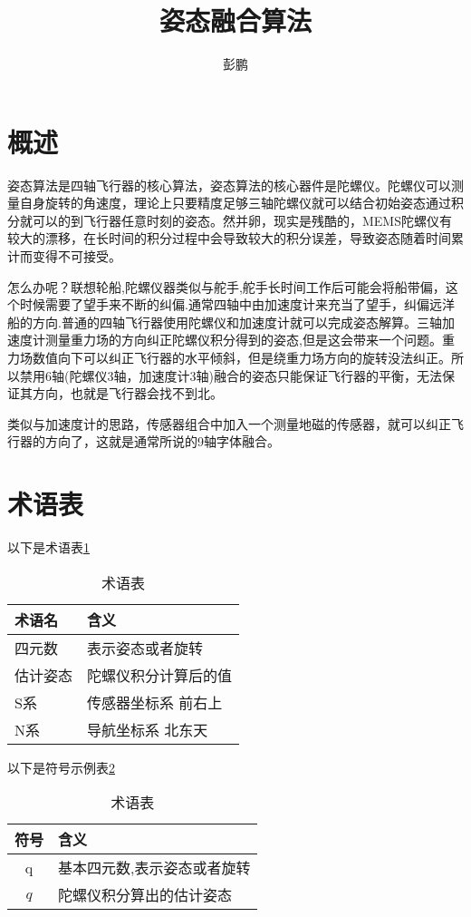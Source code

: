 \documentclass[12pt,a4paper]{article}
\title{姿态融合算法}
\author{彭鹏}
\begin{document}
\maketitle
\tableofcontents
\newpage

\section{概述}
姿态算法是四轴飞行器的核心算法，姿态算法的核心器件是陀螺仪。陀螺仪可以测量自身旋转的角速度，理论上只要精度足够三轴陀螺仪就可以结合初始姿态通过积分就可以的到飞行器任意时刻的姿态。然并卵，现实是残酷的，MEMS陀螺仪有较大的漂移，在长时间的积分过程中会导致较大的积分误差，导致姿态随着时间累计而变得不可接受。

怎么办呢？联想轮船,陀螺仪器类似与舵手,舵手长时间工作后可能会将船带偏，这个时候需要了望手来不断的纠偏.通常四轴中由加速度计来充当了望手，纠偏远洋船的方向.普通的四轴飞行器使用陀螺仪和加速度计就可以完成姿态解算。三轴加速度计测量重力场的方向纠正陀螺仪积分得到的姿态,但是这会带来一个问题。重力场数值向下可以纠正飞行器的水平倾斜，但是绕重力场方向的旋转没法纠正。所以禁用6轴(陀螺仪3轴，加速度计3轴)融合的姿态只能保证飞行器的平衡，无法保证其方向，也就是飞行器会找不到北。

类似与加速度计的思路，传感器组合中加入一个测量地磁的传感器，就可以纠正飞行器的方向了，这就是通常所说的9轴字体融合。

\section{术语表} 
以下是术语表\ref{术语表}
\begin{table}[!hbp]
\begin{center}
    \begin{tabular}{|l|l|}
        \hline
        术语名 & 含义 \\
        \hline
        四元数 & 表示姿态或者旋转 \\
        \hline
        估计姿态 & 陀螺仪积分计算后的值 \\
        \hline
        S系 & 传感器坐标系 前右上 \\
        \hline
        N系 & 导航坐标系 北东天 \\
        \hline
    \end{tabular}
    \caption{术语表\label{术语表}}
\end{center}
\end{table}

以下是符号示例表\ref{符号示例表}
\begin{table}[!hbp]
\begin{center}
    \begin{tabular}{|c|l|}
        \hline
        符号 & 含义 \\
        \hline
        q & 基本四元数,表示姿态或者旋转 \\
        \hline
        $\hat{q}$ & 陀螺仪积分算出的估计姿态 \\
        \hline
    \end{tabular}
    \caption{术语表\label{符号示例表}}
\end{center}
\end{table}
\end{document}
